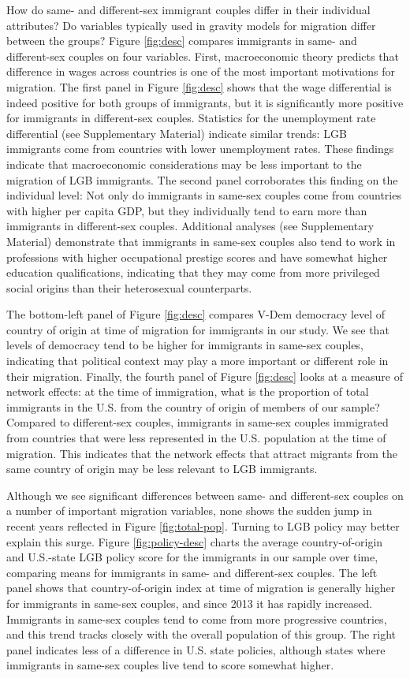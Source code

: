 \documentclass[
  11pt,
]{article}
\begin{document}
How do same- and different-sex immigrant couples differ in their individual attributes? Do variables typically used in gravity models for migration differ between the groups? Figure \ref{fig:desc} compares immigrants in same- and different-sex couples on four variables. First, macroeconomic theory predicts that difference in wages across countries is one of the most important motivations for migration. The first panel in Figure \ref{fig:desc} shows that the wage differential is indeed positive for both groups of immigrants, but it is significantly more positive for immigrants in different-sex couples. Statistics for the unemployment rate differential (see Supplementary Material) indicate similar trends: LGB immigrants come from countries with lower unemployment rates. These findings indicate that macroeconomic considerations may be less important to the migration of LGB immigrants. The second panel corroborates this finding on the individual level: Not only do immigrants in same-sex couples come from countries with higher per capita GDP, but they individually tend to earn more than immigrants in different-sex couples. Additional analyses (see Supplementary Material) demonstrate that immigrants in same-sex couples also tend to work in professions with higher occupational prestige scores and have somewhat higher education qualifications, indicating that they may come from more privileged social origins than their heterosexual counterparts.

The bottom-left panel of Figure \ref{fig:desc} compares V-Dem democracy level of country of origin at time of migration for immigrants in our study. We see that levels of democracy tend to be higher for immigrants in same-sex couples, indicating that political context may play a more important or different role in their migration. Finally, the fourth panel of Figure \ref{fig:desc} looks at a measure of network effects: at the time of immigration, what is the proportion of total immigrants in the U.S. from the country of origin of members of our sample? Compared to different-sex couples, immigrants in same-sex couples immigrated from countries that were less represented in the U.S. population at the time of migration. This indicates that the network effects that attract migrants from the same country of origin may be less relevant to LGB immigrants.

Although we see significant differences between same- and different-sex couples on a number of important migration variables, none shows the sudden jump in recent years reflected in Figure \ref{fig:total-pop}. Turning to LGB policy may better explain this surge. Figure \ref{fig:policy-desc} charts the average country-of-origin and U.S.-state LGB policy score for the immigrants in our sample over time, comparing means for immigrants in same- and different-sex couples. The left panel shows that country-of-origin index at time of migration is generally higher for immigrants in same-sex couples, and since 2013 it has rapidly increased. Immigrants in same-sex couples tend to come from more progressive countries, and this trend tracks closely with the overall population of this group. The right panel indicates less of a difference in U.S. state policies, although states where immigrants in same-sex couples live tend to score somewhat higher.
\end{document}
